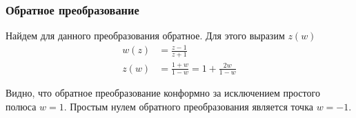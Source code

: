 \begin{frame}\frametitle{Обратное преобразование}
	Найдем для данного преобразования обратное.
	Для этого выразим \(z(w)\)
	\begin{align*}
		w(z) & = \frac{z-1}{z+1}                      \\
		z(w) & = \frac{1+w}{1-w} = 1 + \frac{2w}{1-w}
	\end{align*}

	Видно, что обратное преобразование конформно за исключением
	простого полюса \(w = 1\).
	Простым нулем обратного преобразования является точка \(w = -1\).
\end{frame}
